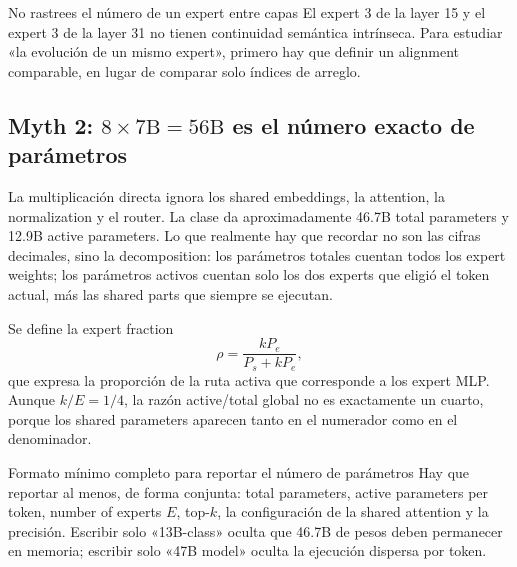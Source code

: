\begin{warningbox}{No rastrees el número de un expert entre capas}
El expert 3 de la layer 15 y el expert 3 de la layer 31 no tienen continuidad semántica intrínseca. Para estudiar «la evolución de un mismo expert», primero hay que definir un alignment comparable, en lugar de comparar solo índices de arreglo.
\end{warningbox}

\subsection{Myth 2: \texorpdfstring{$8\times 7\mathrm{B}=56\mathrm{B}$}{8 x 7B = 56B} es el número exacto de parámetros}

La multiplicación directa ignora los shared embeddings, la attention, la normalization y el router. La clase da aproximadamente 46.7B total parameters y 12.9B active parameters. Lo que realmente hay que recordar no son las cifras decimales, sino la decomposition: los parámetros totales cuentan todos los expert weights; los parámetros activos cuentan solo los dos experts que eligió el token actual, más las shared parts que siempre se ejecutan.


Se define la expert fraction
\[
\rho=\frac{kP_e}{P_s+kP_e},
\]
que expresa la proporción de la ruta activa que corresponde a los expert MLP. Aunque $k/E=1/4$, la razón active/total global no es exactamente un cuarto, porque los shared parameters aparecen tanto en el numerador como en el denominador.

\begin{importantbox}{Formato mínimo completo para reportar el número de parámetros}
Hay que reportar al menos, de forma conjunta: total parameters, active parameters per token, number of experts $E$, top-$k$, la configuración de la shared attention y la precisión. Escribir solo «13B-class» oculta que 46.7B de pesos deben permanecer en memoria; escribir solo «47B model» oculta la ejecución dispersa por token.
\end{importantbox}


